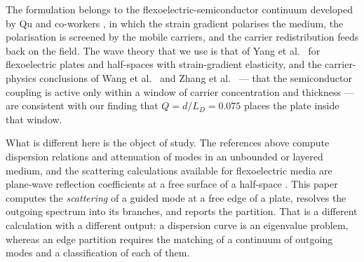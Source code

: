 The formulation belongs to the flexoelectric-semiconductor continuum developed
by Qu and co-workers \cite{qu2020mobile,qu2022thermal}, in which the strain
gradient polarises the medium, the polarisation is screened by the mobile
carriers, and the carrier redistribution feeds back on the field.  The wave
theory that we use is that of Yang et al.\ \cite{yang2018lamb,yang2020rayleigh}
for flexoelectric plates and half-spaces with strain-gradient elasticity, and the
carrier-physics conclusions of Wang et al.\ \cite{wang2025rayleigh} and Zhang et
al.\ \cite{zhang2025pscplate} --- that the semiconductor coupling is active only
within a window of carrier concentration and thickness --- are consistent with
our finding that $Q=d/L_D=0.075$ places the plate inside that window.

What is different here is the object of study.  The references above compute
dispersion relations and attenuation of modes in an unbounded or layered
medium, and the scattering calculations available for flexoelectric media are
plane-wave reflection coefficients at a free surface of a half-space
\cite{mondal2022scattering}.  This paper computes the \emph{scattering} of a
guided mode at a free edge of a plate, resolves the outgoing spectrum into its
branches, and reports the partition.  That is a different calculation with a different output: a
dispersion curve is an eigenvalue problem, whereas an edge partition requires
the matching of a continuum of outgoing modes and a classification of each of
them.

